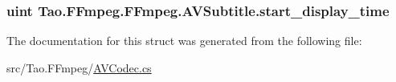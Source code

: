 \label{struct_tao_1_1_f_fmpeg_1_1_f_fmpeg_1_1_a_v_subtitle_a721024059823d4985263f2e7aaa29d68}
\hypertarget{struct_tao_1_1_f_fmpeg_1_1_f_fmpeg_1_1_a_v_subtitle_a8d810e6236f0b489f31b1a6fc5c856d2}{
\subsubsection[{start\_\-display\_\-time}]{\setlength{\rightskip}{0pt plus 5cm}uint {\bf Tao.FFmpeg.FFmpeg.AVSubtitle.start\_\-display\_\-time}}}
\label{struct_tao_1_1_f_fmpeg_1_1_f_fmpeg_1_1_a_v_subtitle_a8d810e6236f0b489f31b1a6fc5c856d2}


The documentation for this struct was generated from the following file:\begin{DoxyCompactItemize}
\item 
src/Tao.FFmpeg/\hyperlink{_a_v_codec_8cs}{AVCodec.cs}\end{DoxyCompactItemize}
